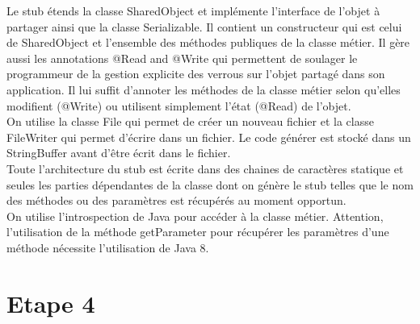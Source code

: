 \documentclass[a4paper,12pt]{article}
\begin{document}
Le stub étends la classe SharedObject et implémente l'interface de l'objet à partager ainsi que la classe Serializable.
Il contient un constructeur qui est celui de SharedObject et l'ensemble des méthodes publiques de la classe métier.
Il gère aussi les annotations @Read and @Write qui permettent de soulager le programmeur de la gestion explicite des verrous sur l'objet partagé dans son application. Il lui suffit d'annoter les méthodes de la classe métier selon qu'elles modifient (@Write) ou utilisent simplement l'état (@Read) de l'objet. \\

On utilise la classe File qui permet de créer un nouveau fichier et la classe FileWriter qui permet d'écrire dans un fichier. Le code générer est stocké dans un StringBuffer avant d'être écrit dans le fichier.\\
Toute l'architecture du stub est écrite dans des chaines de caractères statique et seules les parties dépendantes de la classe dont on génère le stub telles que le nom des méthodes ou des paramètres est récupérés au moment opportun.\\
 On utilise l'introspection de Java pour accéder à la classe métier. Attention, l'utilisation de la méthode getParameter pour récupérer les paramètres d'une méthode nécessite l'utilisation de Java 8.

\clearpage
\section{Etape 4}
\end{document}
